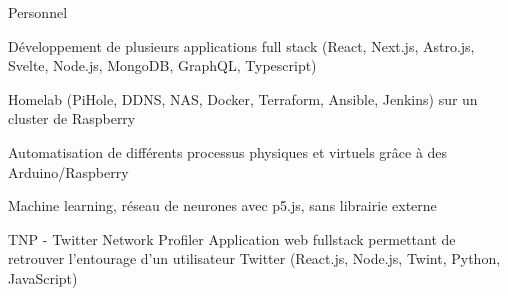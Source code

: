 
\begin{cventries}
  \cventry
    {} %
    {Personnel} %
    {} %
    {} %
    {
      \begin{cvitems} %
        \item {Développement de plusieurs applications full stack (React, Next.js, Astro.js, Svelte, Node.js, MongoDB, GraphQL, Typescript)}
        \item {Homelab (PiHole, DDNS, NAS, Docker, Terraform, Ansible, Jenkins) sur un cluster de Raspberry}
		\item {Automatisation de différents processus physiques et virtuels grâce à des Arduino/Raspberry}
        \item {Machine learning, réseau de neurones avec p5.js, sans librairie externe}
      \end{cvitems}
    }

  \cventry
    {} %
    {TNP - Twitter Network Profiler} %
    {} %
    {} %
    {Application web fullstack permettant de retrouver l'entourage d'un utilisateur Twitter (React.js, Node.js, Twint, Python, JavaScript)}
\end{cventries}